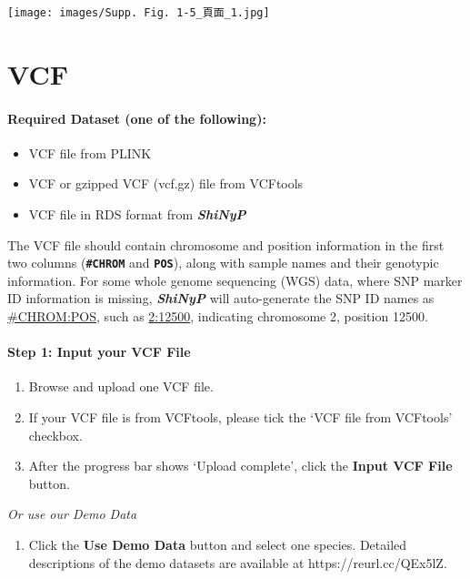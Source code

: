 \documentclass[
]{book}
\providecommand{\tightlist}{%
  \setlength{\itemsep}{0pt}\setlength{\parskip}{0pt}}
\begin{document}
\texttt{[image: images/Supp. Fig. 1-5\_頁面\_1.jpg]}

\section{VCF}\label{vcf}

\paragraph*{Required Dataset (one of the following):}\label{required-dataset-one-of-the-following}

\begin{itemize}
\item
  VCF file from PLINK
\item
  VCF or gzipped VCF (vcf.gz) file from VCFtools
\item
  VCF file in RDS format from {\textbf{\emph{ShiNyP}}}
\end{itemize}

The VCF file should contain chromosome and position information in the first two columns ({\textbf{\texttt{\#CHROM}}} and {\textbf{\texttt{POS}}}), along with sample names and their genotypic information. For some whole genome sequencing (WGS) data, where SNP marker ID information is missing, {\textbf{\emph{ShiNyP}}} will auto-generate the SNP ID names as \ul{\#CHROM:POS}, such as \ul{2:12500}, indicating chromosome 2, position 12500.

\paragraph*{Step 1: Input your VCF File}\label{step-1-input-your-vcf-file}

\begin{enumerate}
\def\labelenumi{\arabic{enumi}.}
\item
  {Browse} and upload one VCF file.
\item
  If your VCF file is from VCFtools, please tick the `VCF file from VCFtools' checkbox.
\item
  After the progress bar shows `Upload complete', click the {\textbf{Input VCF File}} button.
\end{enumerate}

\emph{Or use our Demo Data}

\begin{enumerate}
\def\labelenumi{\arabic{enumi}.}
\tightlist
\item
  Click the {\textbf{Use Demo Data}} button and select one species. Detailed descriptions of the demo datasets are available at https://reurl.cc/QEx5lZ.
\end{enumerate}
\end{document}
